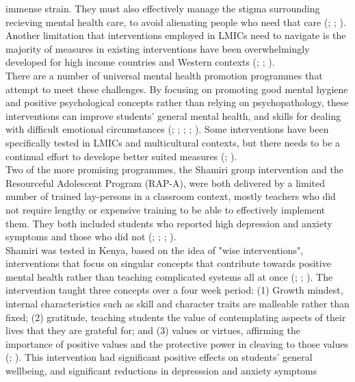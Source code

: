 \documentclass[fontsize=14bp]{article}
\begin{document}
immense strain. They must also effectively manage the stigma surrounding
recieving mental health care, to avoid alienating people who need that care
(\cite{Osetal20b}; \cite{Osetal20}; \cite{Oseral21}). \\
Another limitation that interventions employed in LMICs need to navigate is the
majority of measures in existing interventions have been overwhelmingly
developed for high income countries and Western contexts (\cite{barryetal13};
\cite{oretal18}; \cite{Osetal20}). \\
There are a number of universal mental health promotion programmes that attempt
to meet these challenges. By focusing on promoting good mental hygiene and
positive psychological concepts rather than relying on psychopathology, these
interventions can improve students' general mental health, and skills for
dealing with difficult emotional circumstances (\cite{barryetal13};
\cite{oretal18}; \cite{Osetal20}; \cite{Oseral21}; \cite{riduvetal11}).
Some interventions have been specifically tested in LMICs and multicultural
contexts, but there needs to be a continual effort to develope better suited
measures (\cite{barryetal13}; \cite{Osetal20}). \\
Two of the more promising programmes, the Shamiri group intervention
and the Resourceful Adolescent Program (RAP-A), were both delivered by
a limited number of trained lay-persons in a classroom context, mostly teachers
who did not require lengthy or expensive training to be able to effectively
implement them. They both included students who reported high depression and
anxiety symptoms and those who did not (\cite{Osetal20b}; \cite{Osetal20};
\cite{Oseral21}; \cite{riduvetal11}). \\
Shamiri was tested in Kenya, based on the idea of "wise interventions",
interventions that focus on singular concepts that contribute towards positive
mental health rather than teaching complicated systems all at once (\cite{Osetal20b};
\cite{Osetal20}; \cite{Oseral21}). The intervention taught three concepts over
a four week period: (1) Growth mindest, internal characteristics
such as skill and character traits are malleable rather than fixed; (2)
gratitude, teaching students the value of contemplating aspects of their lives
that they are grateful for; and (3) values or virtues, affirming the importance
of positive values and the protective power in cleaving to those values (\cite{Osetal20b}; \cite{Oseral21}).
This intervention had significant positive effects on students' general
wellbeing, and significant reductions in depresssion and anxiety symptoms
\end{document}

